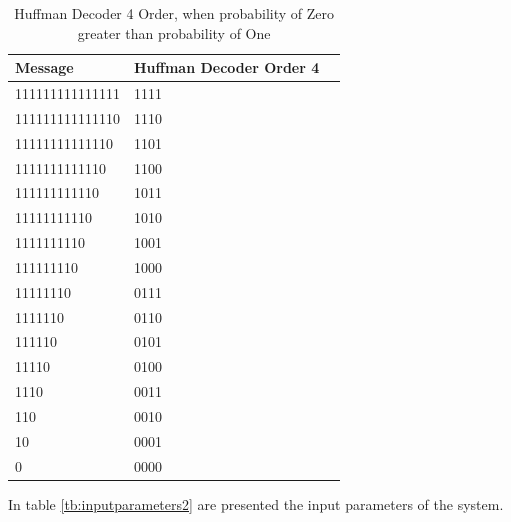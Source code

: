 \begin{refsection}
\begin{table}[H]
\centering
\caption{Huffman Decoder 4 Order, when probability of Zero greater than probability of One}
\label{tb:hufmmandecoder7}
\begin{tabular}{|l|l|l|}
\hline
\textbf{Message}                      & \textbf{Huffman Decoder Order 4}                                       \\ \hline
111111111111111      & 1111                                                   \\ \hline
111111111111110      & 1110                                        \\ \hline
11111111111110        & 1101                                    \\ \hline
1111111111110          & 1100                             \\ \hline
111111111110            & 1011                                              \\ \hline
11111111110              & 1010                                            \\ \hline
1111111110                & 1001                                         \\ \hline
111111110                  & 1000                                       \\ \hline
11111110                    & 0111                                      \\ \hline
1111110                      & 0110                                     \\ \hline
111110                        & 0101                                 \\ \hline
11110                          & 0100                         \\ \hline
1110                            & 0011                              \\ \hline
110                              & 0010                            \\ \hline
10                                & 0001                         \\ \hline
0                                  & 0000                      \\ \hline
\end{tabular}
\end{table}

In table \ref{tb:inputparameters2} are presented the input parameters of the system.






\end{refsection}
